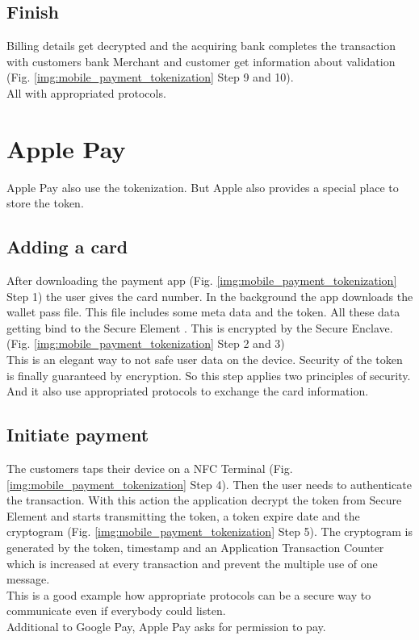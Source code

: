 \subsection{Finish}
\label{chp:example:sec:googlePay:ssec:finish}

Billing details get decrypted and the acquiring bank completes the transaction with customers bank Merchant and customer get information about validation (Fig. \ref{img:mobile_payment_tokenization} Step 9 and 10).\\ All with appropriated protocols. 

\section{Apple Pay}
\label{chp:example:sec:applePay}

Apple Pay also use the tokenization. But Apple also provides a special place to store the token. 

\subsection{Adding a card}
\label{chp:example:sec:applePay:ssec:addingACard}

After downloading the payment app (Fig. \ref{img:mobile_payment_tokenization} Step 1) the user gives the card number. In the background the app downloads the wallet pass file. This file includes some meta data and the token. All these data getting bind to the Secure Element \cite{applePay}. This is encrypted by the Secure Enclave. (Fig. \ref{img:mobile_payment_tokenization} Step 2 and 3) \\
This is an elegant way to not safe user data on the device. Security of the token is finally guaranteed by encryption. So this step applies two principles of security. And it also use appropriated protocols to exchange the card information.

\subsection{Initiate payment}
\label{chp:example:sec:applePay:ssec:initiate}

The customers taps their device on a NFC Terminal (Fig. \ref{img:mobile_payment_tokenization} Step 4). Then the user needs to authenticate the transaction. With this action the application decrypt the token from Secure Element and starts transmitting the token, a token expire date and the cryptogram (Fig. \ref{img:mobile_payment_tokenization} Step 5). The cryptogram is generated by the token, timestamp and an Application Transaction Counter which is increased at every transaction and prevent the multiple use of one message.\\
This is a good example how appropriate protocols can be a secure way to communicate even if everybody could listen.\\
Additional to Google Pay, Apple Pay asks for permission to pay.

